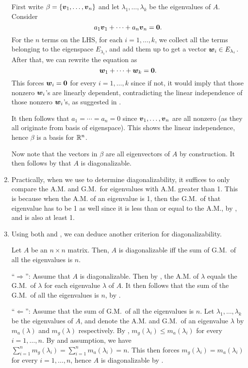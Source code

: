\begin{enumerate}
\begin{pf}
First write \(\beta=\{\vb*{v}_1,\dotsc,\vb*{v}_n\}\) and let
\(\lambda_1,\dotsc,\lambda_k\) be the eigenvalues of \(A\). Consider
\[
a_1\vb*{v}_1+\dotsb+a_n\vb*{v}_n=\vb*{0}.
\]
For the \(n\) terms on the LHS, for each \(i=1,\dotsc,k\), we collect all the
terms belonging to the eigenspace \(E_{\lambda_{i}}\), and add them up to get a
vector \(\vb*{w}_i\in E_{\lambda_i}\). After that, we can rewrite the equation as
\[
\vb*{w}_1+\dotsb+\vb*{w}_k=\vb*{0}.
\]
This forces \(\vb*{w}_i=\vb*{0}\) for every \(i=1,\dotsc,k\) since if not, it
would imply that those nonzero \(\vb*{w}_i\)'s are linearly dependent,
contradicting the linear independence of those nonzero \(\vb*{w}_i\)'s, as
suggested in .

It then follows that \(a_1=\dotsb=a_n=0\) since
\(\vb*{v}_1,\dotsc,\vb*{v}_n\) are all nonzero (as they all originate from
basis of eigenspace). This shows the linear independence, hence \(\beta\) is a
basis for \(\mathbb{R}^n\).

Now note that the vectors in \(\beta\) are all eigenvectors of \(A\) by
construction. It then follows by  that \(A\) is
diagonalizable.
\end{pf}

\item Practically, when we use  to determine
diagonalizability, it suffices to only compare the A.M. and G.M.\ for
eigenvalues with A.M. greater than 1. This is because when the A.M. of an
eigenvalue is 1, then the G.M.\ of that eigenvalue has to be 1 as well since it
is less than or equal to the A.M., by , and is also at
least 1.

\item Using both  and , we can
deduce another criterion for diagonalizability.

\begin{corollary}
\label{cor:diag-iff-gm-sum2n}
Let \(A\) be an \(n\times n\) matrix. Then, \(A\) is diagonalizable iff the sum
of G.M.\ of all the eigenvalues is \(n\).
\end{corollary}
\begin{pf}
``\(\Rightarrow\)'': Assume that \(A\) is diagonalizable. Then by
, the A.M. of \(\lambda\) equals the G.M.\ of
\(\lambda\) for each eigenvalue \(\lambda\) of \(A\). It then follows that the
sum of the G.M.\ of all the eigenvalues is \(n\), by .

``\(\Leftarrow\)'': Assume that the sum of G.M.\ of all the eigenvalues is
\(n\). Let \(\lambda_1,\dotsc,\lambda_k\) be the eigenvalues of \(A\), and
denote the A.M. and G.M.\ of an eigenvalue \(\lambda\) by \(m_a(\lambda)\) and
\(m_g(\lambda)\) respectively. By , \(m_g(\lambda_i)\le
m_a(\lambda_i)\) for every \(i=1,\dotsc,n\). By  and
assumption, we have
\(\sum_{i=1}^{n}m_g(\lambda_i)=\sum_{i=1}^{n}m_a(\lambda_i)=n\). This then
forces \(m_g(\lambda_i)=m_a(\lambda_i)\) for every \(i=1,\dotsc,n\), hence
\(A\) is diagonalizable by .
\end{pf}

\end{enumerate}

